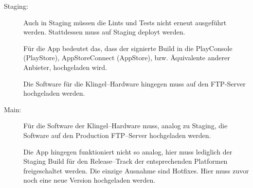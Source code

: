 \begin{description}
    \item[Staging:]
        Auch in Staging müssen die Lints und Tests nicht erneut ausgeführt werden.
        Stattdessen muss auf Staging deployt werden.


        Für die App bedeutet das, dass der signierte Build in die PlayConsole (PlayStore), AppStoreConnect (AppStore), bzw. Äquivalente anderer Anbieter, hochgeladen wird.


        Die Software für die Klingel--Hardware hingegen muss auf den FTP-Server hochgeladen werden.


    \item[Main:]
        Für die Software der Klingel--Hardware muss, analog zu Staging, die Software auf den Production FTP--Server hochgeladen werden.


        Die App hingegen funktioniert nicht so analog, hier muss lediglich der Staging Build für den Release--Track der entsprechenden Platformen freigeschaltet werden.
        Die einzige Ausnahme sind Hotfixes.
        Hier muss zuvor noch eine neue Version hochgeladen werden.
\end{description}
